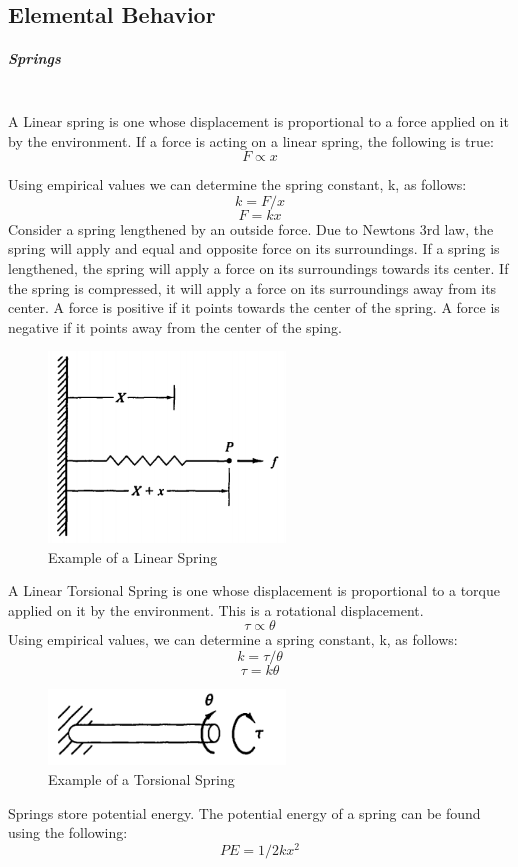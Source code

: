 \documentclass[paper=a4, fontsize=11pt]{scrartcl} %
\numberwithin{equation}{section} %
\numberwithin{figure}{section} %
\numberwithin{table}{section} %
\begin{document}
\subsection{Elemental Behavior}

\subparagraph{Springs}~ \\
A Linear spring is one whose displacement is proportional to a force applied on it by the environment. If a force is acting on a linear spring, the following is true: 
$$F \propto x$$

Using empirical values we can determine the spring constant, k, as follows:
$$k = F/x$$
$$F = kx$$
Consider a spring lengthened by an outside force. Due to Newtons 3rd law, the spring will apply and equal and opposite force on its surroundings. If a spring is lengthened, the spring will apply a force on its surroundings towards its center. If the spring is compressed, it will apply a force on its surroundings away from its center. A force is positive if it points towards the center of the spring. A force is negative if it points away from the center of the sping.\\

\begin{figure}
\begin{center}
  \includegraphics[width=17em]{Linear_Spring_1.png}
  \caption{Example of a Linear Spring}
  \label{fig:boat1}
\end{center}
\end{figure}

A Linear Torsional Spring is one whose displacement is proportional to a torque applied on it by the environment. This is a rotational displacement. \\
$$\tau \propto \theta$$
Using empirical values, we can determine a spring constant, k, as follows:
$$k = \tau/\theta$$
$$\tau = k\theta$$

\begin{figure}
\begin{center}
  \includegraphics[width=17em]{Torsional_Spring_1.png}
  \caption{Example of a Torsional Spring}
  \label{fig:boat1}
\end{center}
\end{figure}
Springs store potential energy. The potential energy of a spring can be found using the following: \\
$$PE = 1/2 kx^2$$
\end{document}

